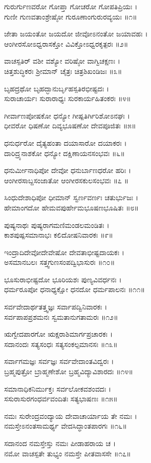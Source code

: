 ಗುರುರ್ಗುಣವರೋ ಗೋಪ್ತಾ ಗೋಚರೋ ಗೋಪತಿಪ್ರಿಯಃ ।\\
ಗುಣೀ ಗುಣವತಾಂಶ್ರೇಷ್ಠೋ ಗುರೂಣಾಂಗುರುರವ್ಯಯಃ ॥೧॥

ಜೇತಾ ಜಯಂತೋ ಜಯದೋ ಜೀವೋಽನಂತೋ ಜಯಾವಹಃ ।\\
ಆಂಗೀರಸೋಽಧ್ವರಾಸಕ್ತೋ ವಿವಿಕ್ತೋಽಧ್ವರಕೃತ್ಪರಃ ॥೨॥

ವಾಚಸ್ಪತಿರ್ ವಶೀ ವಶ್ಯೋ ವರಿಷ್ಠೋ ವಾಗ್ವಿಚಕ್ಷಣಃ ।\\
ಚಿತ್ತಶುದ್ಧಿಕರಃ ಶ್ರೀಮಾನ್ ಚೈತ್ರಃ ಚಿತ್ರಶಿಖಂಡಿಜಃ ॥೩॥

ಬೃಹದ್ರಥೋ ಬೃಹದ್ಭಾನುರ್ಬೃಹಸ್ಪತಿರಭೀಷ್ಟದಃ ।\\
ಸುರಾಚಾರ್ಯಃ ಸುರಾರಾಧ್ಯಃ ಸುರಕಾರ್ಯಹಿತಂಕರಃ ॥೪॥

ಗೀರ್ವಾಣಪೋಷಕೋ ಧನ್ಯೋ ಗೀಷ್ಪತಿರ್ಗಿರಿಶೋಽನಘಃ ।\\
ಧೀವರೋ ಧಿಷಣೋ ದಿವ್ಯಭೂಷಣೋ ದೇವಪೂಜಿತಃ ॥೫॥

ಧನುರ್ಧರೋ ದೈತ್ಯಹಂತಾ ದಯಾಸಾರೋ ದಯಾಕರಃ ।\\
ದಾರಿದ್ರ್ಯನಾಶಕೋ ಧನ್ಯೋ ದಕ್ಷಿಣಾಯನಸಂಭವಃ ॥೬॥

ಧನುರ್ಮೀನಾಧಿಪೋ ದೇವೋ ಧನುರ್ಬಾಣಧರೋ ಹರಿಃ ।\\
ಆಂಗೀರಸಾಬ್ದಸಂಜಾತೋ ಆಂಗೀರಸಕುಲಸಂಭವಃ ॥೭ ॥

ಸಿಂಧುದೇಶಾಧಿಪೋ ಧೀಮಾನ್ ಸ್ವರ್ಣವರ್ಣಃ ಚತುರ್ಭುಜಃ ।\\
ಹೇಮಾಂಗದೋ ಹೇಮವಪುರ್ಹೇಮಭೂಷಣಭೂಷಿತಃ ॥೮॥

ಪುಷ್ಯನಾಥಃ ಪುಷ್ಯರಾಗಮಣಿಮಂಡಲಮಂಡಿತಃ ।\\
ಕಾಶಪುಷ್ಪಸಮಾನಾಭಃ ಕಲಿದೋಷನಿವಾರಕಃ ॥೯॥

ಇಂದ್ರಾದಿದೇವೋದೇವೇಷೋ ದೇವತಾಭೀಷ್ಟದಾಯಕಃ ।\\
ಅಸಮಾನಬಲಃ ಸತ್ತ್ವಗುಣಸಂಪದ್ವಿಭಾಸುರಃ ॥೧೦॥

ಭೂಸುರಾಭೀಷ್ಟದೋ ಭೂರಿಯಶಃ ಪುಣ್ಯವಿವರ್ಧನಃ ।\\
ಧರ್ಮರೂಪೋ ಧನಾಧ್ಯಕ್ಷೋ ಧನದೋ ಧರ್ಮಪಾಲನಃ ॥೧೧॥

ಸರ್ವವೇದಾರ್ಥತತ್ತ್ವಜ್ಞಃ ಸರ್ವಾಪದ್ವಿನಿವಾರಕಃ ।\\
ಸರ್ವಪಾಪಪ್ರಶಮನಃ ಸ್ವಮತಾನುಗತಾಮರಃ ॥೧೨॥

ಋಗ್ವೇದಪಾರಗೋ ಋಕ್ಷರಾಶಿಮಾರ್ಗಪ್ರಚಾರಕಃ ।\\
ಸದಾನಂದಃ ಸತ್ಯಸಂಧಃ ಸತ್ಯಸಂಕಲ್ಪಮಾನಸಃ ॥೧೩॥

ಸರ್ವಾಗಮಜ್ಞಃ ಸರ್ವಜ್ಞಃ ಸರ್ವವೇದಾಂತವಿದ್ವರಃ ।\\
ಬ್ರಹ್ಮಪುತ್ರೋ ಬ್ರಾಹ್ಮಣೇಶೋ ಬ್ರಹ್ಮವಿದ್ಯಾವಿಶಾರದಃ ॥೧೪॥

ಸಮಾನಾಧಿಕನಿರ್ಮುಕ್ತಃ ಸರ್ವಲೋಕವಶಂವದಃ ।\\
ಸಸುರಾಸುರಗಂಧರ್ವವಂದಿತಃ ಸತ್ಯಭಾಷಣಃ ॥೧೫॥

ನಮಃ ಸುರೇಂದ್ರವಂದ್ಯಾಯ ದೇವಾಚಾರ್ಯಾಯ ತೇ ನಮಃ ।\\
ನಮಸ್ತೇಽನಂತಸಾಮರ್ಥ್ಯ ವೇದಸಿದ್ಧಾಂತಪಾರಗಃ ॥೧೬॥

ಸದಾನಂದ ನಮಸ್ತೇಸ್ತು ನಮಃ ಪೀಡಾಹರಾಯ ಚ ।\\
ನಮೋ ವಾಚಸ್ಪತೇ ತುಭ್ಯಂ ನಮಸ್ತೇ ಪೀತವಾಸಸೇ ॥೧೭॥

